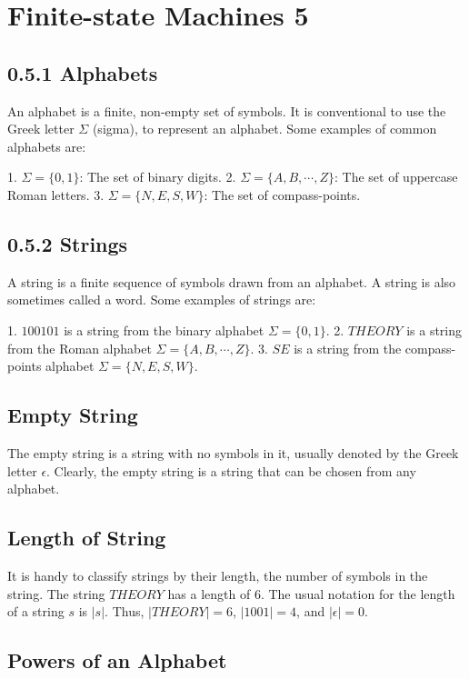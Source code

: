 \documentclass{article}
\begin{document}
\section{Finite-state Machines 5}

\subsection{0.5.1 Alphabets}

An alphabet is a finite, non-empty set of symbols. It is conventional to use the Greek letter $\Sigma$ (sigma), to represent an alphabet. Some examples of common alphabets are:

1. $\Sigma = \{0, 1\}$: The set of binary digits.
2. $\Sigma = \{A, B, \cdots, Z\}$: The set of uppercase Roman letters.
3. $\Sigma = \{N, E, S, W\}$: The set of compass-points.

\subsection{0.5.2 Strings}

A string is a finite sequence of symbols drawn from an alphabet. A string is also sometimes called a word. Some examples of strings are:

1. $100101$ is a string from the binary alphabet $\Sigma = \{0, 1\}$.
2. $THEORY$ is a string from the Roman alphabet $\Sigma = \{A, B, \cdots, Z\}$.
3. $SE$ is a string from the compass-points alphabet $\Sigma = \{N, E, S, W\}$.

\subsection{Empty String}

The empty string is a string with no symbols in it, usually denoted by the Greek letter $\epsilon$. Clearly, the empty string is a string that can be chosen from any alphabet.

\subsection{Length of String}

It is handy to classify strings by their length, the number of symbols in the string. The string $THEORY$ has a length of 6. The usual notation for the length of a string $s$ is $|s|$. Thus, $|THEORY| = 6$, $|1001| = 4$, and $|\epsilon| = 0$.

\subsection{Powers of an Alphabet}
\end{document}
